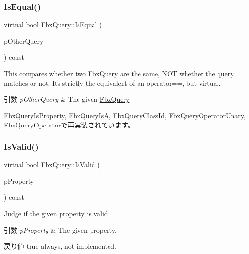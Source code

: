 \subsubsection{\texorpdfstring{Is\+Equal()}{IsEqual()}}
{\footnotesize\ttfamily virtual bool Fbx\+Query\+::\+Is\+Equal (\begin{DoxyParamCaption}\item[{\hyperlink{class_fbx_query}{Fbx\+Query} $\ast$}]{p\+Other\+Query }\end{DoxyParamCaption}) const\hspace{0.3cm}{\ttfamily [virtual]}}

This compares whether two \hyperlink{class_fbx_query}{Fbx\+Query} are the same, N\+OT whether the query matches or not. It\textquotesingle{}s strictly the equivalent of an operator==, but virtual. 
\begin{DoxyParams}{引数}
{\em p\+Other\+Query} & The given \hyperlink{class_fbx_query}{Fbx\+Query} \\
\hline
\end{DoxyParams}


\hyperlink{class_fbx_query_is_property_ace0b3dd62cc2614acc88ad892849416b}{Fbx\+Query\+Is\+Property}, \hyperlink{class_fbx_query_is_a_a49b41a34152be44240671b8ae59a4d19}{Fbx\+Query\+IsA}, \hyperlink{class_fbx_query_class_id_ac20046270f87a7bb84fbf776980431af}{Fbx\+Query\+Class\+Id}, \hyperlink{class_fbx_query_operator_unary_a36c2fea0f42bd732d559375d64b0134e}{Fbx\+Query\+Operator\+Unary}, \hyperlink{class_fbx_query_operator_aa96734a4da59286a2cab2832f0529175}{Fbx\+Query\+Operator}で再実装されています。

\mbox{\label{class_fbx_query_a822776baf45a56d8e126e948ec25d920}} 
\subsubsection{\texorpdfstring{Is\+Valid()}{IsValid()}}
{\footnotesize\ttfamily virtual bool Fbx\+Query\+::\+Is\+Valid (\begin{DoxyParamCaption}\item[{const \hyperlink{class_fbx_property}{Fbx\+Property} \&}]{p\+Property }\end{DoxyParamCaption}) const\hspace{0.3cm}{\ttfamily [virtual]}}

Judge if the given property is valid. 
\begin{DoxyParams}{引数}
{\em p\+Property} & The given property. \\
\hline
\end{DoxyParams}
\begin{DoxyReturn}{戻り値}
{\ttfamily true} always, not implemented. 
\end{DoxyReturn}


